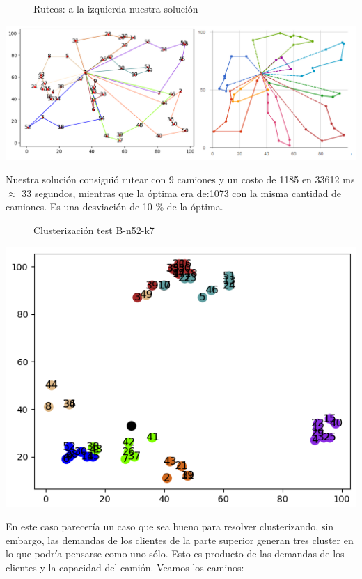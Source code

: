 \documentclass[11pt,a4paper]{article}
\begin{document}
\begin{figure}[!h]
\caption{Ruteos: a la izquierda nuestra solución}
\end{figure}
\includegraphics[scale=.5]{graficos/A-n55-k9/caminos.png}

Nuestra solución consiguió rutear con 9 camiones y un costo de 1185 en 33612 ms $\approx$ 33 segundos, mientras que la óptima era de:1073 con la misma cantidad de camiones. Es una desviación de 10 \% de la óptima. 
\\
\begin{figure}[!h]
\caption{Clusterización test B-n52-k7}
\end{figure}
\includegraphics[scale=.5]{graficos/B-n52-k7/cluster.png}

En este caso parecería un caso que sea bueno para resolver clusterizando, sin embargo, las demandas de los clientes de la parte superior generan tres cluster en lo que podría pensarse como uno sólo. Esto es producto de las demandas de los clientes y la capacidad del camión. Veamos los caminos:
\end{document}
